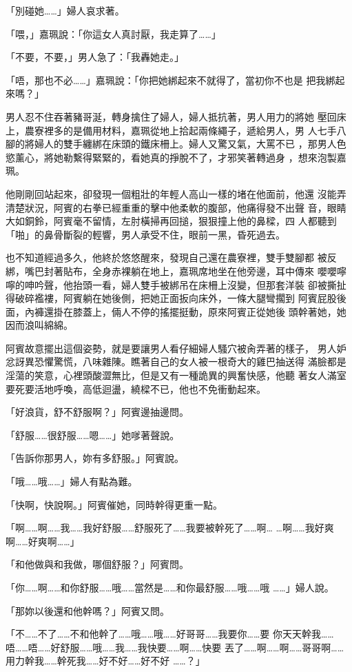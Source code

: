 「別碰她……」婦人哀求著。

「喂，」嘉珮說：「你這女人真討厭，我走算了……」

「不要，不要，」男人急了：「我轟她走。」

「唔，那也不必……」嘉珮說：「你把她綁起來不就得了，當初你不也是
把我綁起來嗎？」

男人忍不住吞著豬哥涎，轉身擒住了婦人，婦人抵抗著，男人用力的將她
壓回床上，農寮裡多的是備用材料，嘉珮從地上拾起兩條繩子，遞給男人，男
人七手八腳的將婦人的雙手纏綁在床頭的鐵床柵上。婦人又驚又氣，大罵不已
，那男人色慾薰心，將她勒繫得緊緊的，看她真的掙脫不了，才邪笑著轉過身
，想來泡製嘉珮。

他剛剛回站起來，卻發現一個粗壯的年輕人高山一樣的堵在他面前，他還
沒能弄清楚狀況，阿賓的右拳已經重重的擊中他柔軟的腹部，他痛得發不出聲
音，眼睛大如銅鈴，阿賓毫不留情，左肘橫掃再回搥，狠狠撞上他的鼻樑，四
人都聽到「啪」的鼻骨斷裂的輕響，男人承受不住，眼前一黑，昏死過去。

也不知道經過多久，他終於悠悠醒來，發現自己還在農寮裡，雙手雙腳都
被反綁，嘴巴封著貼布，全身赤裸躺在地上，嘉珮席地坐在他旁邊，耳中傳來
嚶嚶嚀嚀的呻吟聲，他抬頭一看，婦人雙手被綁吊在床柵上沒變，但那套洋裝
卻被撕扯得破碎襤褸，阿賓躺在她後側，把她正面扳向床外，一條大腿彎擱到
阿賓屁股後面，內褲還掛在膝蓋上，倆人不停的搖擺挺動，原來阿賓正從她後
頭幹著她，她因而浪叫綿綿。

阿賓故意擺出這個姿勢，就是要讓男人看仔細婦人騷穴被肏弄著的樣子，
男人妒忿訝異恐懼驚慌，八味雜陳。瞧著自己的女人被一根奇大的雞巴抽送得
滿臉都是淫蕩的笑意，心裡頭酸澀無比，但是又有一種詭異的興奮快感，他聽
著女人滿室要死要活地呼喚，高低迴盪，繞樑不已，他也不免衝動起來。

「好浪貨，舒不舒服啊？」阿賓邊抽邊問。

「舒服……很舒服……嗯……」她嗲著聲說。

「告訴你那男人，妳有多舒服。」阿賓說。

「哦……哦……」婦人有點為難。

「快啊，快說啊。」阿賓催她，同時幹得更重一點。

「啊……啊……我……我好舒服……舒服死了……我要被幹死了……啊…
…啊……我好爽啊……好爽啊……」

「和他做與和我做，哪個舒服？」阿賓問。

「你……啊……和你舒服……哦……當然是……和你最舒服……哦……哦
……」婦人說。

「那妳以後還和他幹嗎？」阿賓又問。

「不……不了……不和他幹了……哦……哦……好哥哥……我要你……要
你天天幹我……唔……唔……好舒服……哦……我……我快要……啊……快要
丟了……啊……啊……哥哥啊……用力幹我……幹死我……好不好……好不好
……？」

